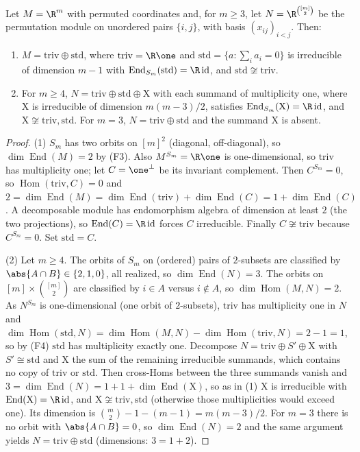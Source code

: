 \documentclass[../main.tex]{subfiles}
\begin{document}
\begin{lemma}
\label{lem:sol-frd2-irreducibles}
Let $M=\R^m$ with permuted coordinates and, for $m\ge3$, let $N=\R^{\binom{[m]}2}$ be
the permutation module on unordered pairs $\{i,j\}$, with basis $(x_{ij})_{i<j}$.
Then:
\begin{enumerate}
\item $M=\mathrm{triv}\oplus\mathrm{std}$, where $\mathrm{triv}=\R\one$ and
  $\mathrm{std}=\{a:\sum_ia_i=0\}$ is irreducible of dimension $m-1$ with
  $\operatorname{End}_{S_m}(\mathrm{std})=\R\,\mathrm{id}$, and
  $\mathrm{std}\not\cong\mathrm{triv}$.
\item For $m\ge4$, $N=\mathrm{triv}\oplus\mathrm{std}\oplus\mathrm X$ with each
  summand of multiplicity one, where $\mathrm X$ is irreducible of dimension
  $m(m-3)/2$, satisfies $\operatorname{End}_{S_m}(\mathrm X)=\R\,\mathrm{id}$, and
  $\mathrm X\not\cong\mathrm{triv},\mathrm{std}$.  For $m=3$,
  $N=\mathrm{triv}\oplus\mathrm{std}$ and the summand $\mathrm X$ is absent.
\end{enumerate}
\end{lemma}

\begin{proof}
(1)  $S_m$ has two orbits on $[m]^2$ (diagonal, off-diagonal), so
$\dim\operatorname{End}(M)=2$ by (F3).  Also $M^{S_m}=\R\one$ is one-dimensional, so
$\mathrm{triv}$ has multiplicity one; let $C=\one^\perp$ be its invariant complement.
Then $C^{S_m}=0$, so $\operatorname{Hom}(\mathrm{triv},C)=0$ and
$2=\dim\operatorname{End}(M)
 =\dim\operatorname{End}(\mathrm{triv})+\dim\operatorname{End}(C)
 =1+\dim\operatorname{End}(C)$.
A decomposable module has endomorphism algebra of dimension at least $2$ (the two
projections), so $\operatorname{End}(C)=\R\,\mathrm{id}$ forces $C$ irreducible.
Finally $C\not\cong\mathrm{triv}$ because $C^{S_m}=0$.  Set $\mathrm{std}=C$.

(2)  Let $m\ge4$.  The orbits of $S_m$ on (ordered) pairs of $2$-subsets are
classified by $\abs{A\cap B}\in\{2,1,0\}$, all realized, so
$\dim\operatorname{End}(N)=3$.  The orbits on $[m]\times\binom{[m]}2$ are classified
by $i\in A$ versus $i\notin A$, so $\dim\operatorname{Hom}(M,N)=2$.  As
$N^{S_m}$ is one-dimensional (one orbit of $2$-subsets), $\mathrm{triv}$ has
multiplicity one in $N$ and
$\dim\operatorname{Hom}(\mathrm{std},N)
 =\dim\operatorname{Hom}(M,N)-\dim\operatorname{Hom}(\mathrm{triv},N)=2-1=1$,
so by (F4) $\mathrm{std}$ has multiplicity exactly one.  Decompose
$N=\mathrm{triv}\oplus S'\oplus \mathrm X$ with $S'\cong\mathrm{std}$ and $\mathrm X$
the sum of the remaining irreducible summands, which contains no copy of
$\mathrm{triv}$ or $\mathrm{std}$.  Then cross-Homs between the three summands vanish
and
$3=\dim\operatorname{End}(N)=1+1+\dim\operatorname{End}(\mathrm X)$,
so as in (1) $\mathrm X$ is irreducible with
$\operatorname{End}(\mathrm X)=\R\,\mathrm{id}$, and
$\mathrm X\not\cong\mathrm{triv},\mathrm{std}$ (otherwise those multiplicities would
exceed one).  Its dimension is $\binom m2-1-(m-1)=m(m-3)/2$.  For $m=3$ there is no
orbit with $\abs{A\cap B}=0$, so $\dim\operatorname{End}(N)=2$ and the same argument
yields $N=\mathrm{triv}\oplus\mathrm{std}$ (dimensions: $3=1+2$).
\end{proof}
\end{document}
